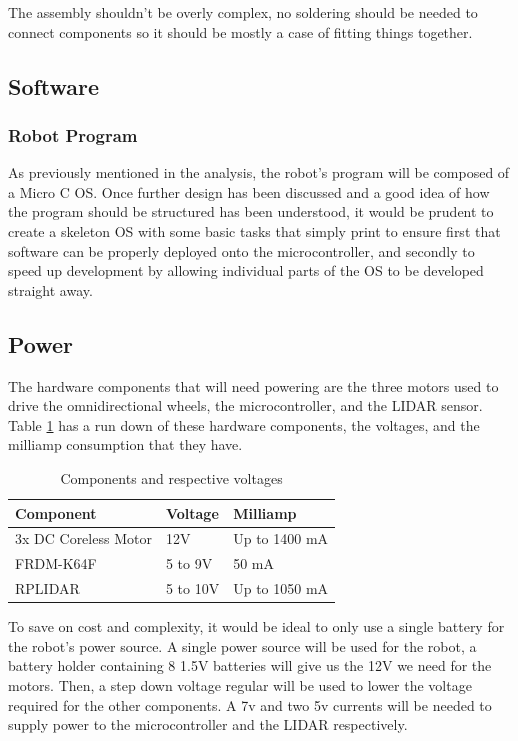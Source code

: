 				The assembly shouldn't be overly complex, no soldering should be needed to connect components so it should be mostly a case of fitting things together.
			\subsection{Software}
				\subsubsection{Robot Program}
				As previously mentioned in the analysis, the robot's program will be composed of a Micro C OS. Once further design has been discussed and a good idea of how the program should be structured has been understood, it would be prudent to create a skeleton OS with some basic tasks that simply print to ensure first that software can be properly deployed onto the microcontroller, and secondly to speed up development by allowing individual parts of the OS to be developed straight away.
				
			\subsection{Power}
			The hardware components that will need powering are the three motors used to drive the omnidirectional wheels, the microcontroller, and the LIDAR sensor. Table \ref{table:1} has a run down of these hardware components, the voltages, and the milliamp consumption that they have.
				
			\begin{table}[h]
				\centering
				\begin{tabular}{|| l | l | l ||} 
					\hline
					Component & Voltage & Milliamp \\ [0.5ex] 
					\hline
					3x DC Coreless Motor  & 12V & Up to 1400 mA  \\ 
					FRDM-K64F  & 5 to 9V &  50 mA \\
					RPLIDAR  & 5 to 10V & Up to 1050 mA\\
					\hline
				\end{tabular}
				\caption{Components and respective voltages}
				\label{table:1}
			\end{table}
			
			To save on cost and complexity, it would be ideal to only use a single battery for the robot's power source. A single power source will be used for the robot, a battery holder containing 8 1.5V batteries will give us the 12V we need for the motors. Then, a step down voltage regular will be used to lower the voltage required for the other components. A 7v and two 5v currents will be needed to supply power to the microcontroller and the LIDAR respectively.
				
